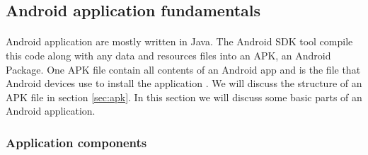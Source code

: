\documentclass[../main.tex]{subfile}
\begin{document}
	\paragraph{} 
	\subsection{Android application fundamentals}\label{sec:app_fundamentals}
		\paragraph{} Android application are mostly written in Java. The Android SDK tool compile this code along with any data and resources files into an APK, an Android Package. One APK file contain all contents of an Android app and is the file that Android devices use to install the application \cite{app_fundamentals}. We will discuss the structure of an APK file in section \ref{sec:apk}. In this section we will discuss some basic parts of an Android application.
		
		\subsubsection{Application components}
\end{document}
